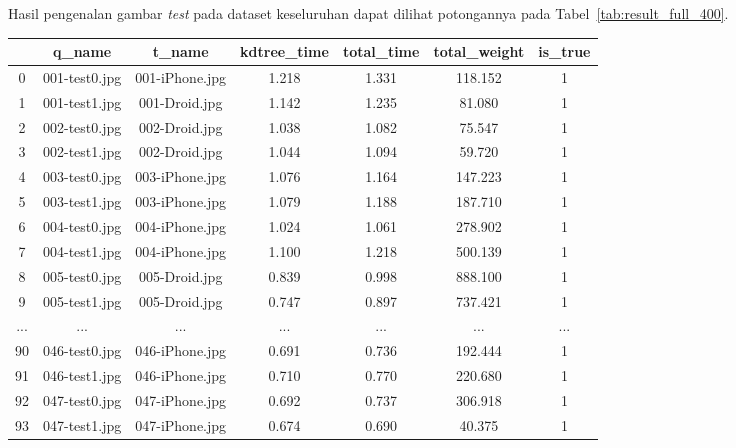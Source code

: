 Hasil pengenalan gambar \textit{test} pada dataset keseluruhan dapat dilihat potongannya pada Tabel~\ref{tab:result_full_400}.
\begin{table}[H]
	\centering
	\begin{tabular}{|c|c|c|c|c|c|c|} 
		\hline
		& \textbf{q\_name}       & \textbf{t\_name}        & \textbf{kdtree\_time} & \textbf{total\_time} & \textbf{total\_weight} & \textbf{is\_true}  \\ 
		\hline
		0   & 001-test0.jpg & 001-iPhone.jpg & 1.218        & 1.331       & 118.152       & 1         \\ 
		\hline
		1   & 001-test1.jpg & 001-Droid.jpg  & 1.142        & 1.235       & 81.080        & 1         \\ 
		\hline
		2   & 002-test0.jpg & 002-Droid.jpg  & 1.038        & 1.082       & 75.547        & 1         \\ 
		\hline
		3   & 002-test1.jpg & 002-Droid.jpg  & 1.044        & 1.094       & 59.720        & 1         \\ 
		\hline
		4   & 003-test0.jpg & 003-iPhone.jpg & 1.076        & 1.164       & 147.223       & 1         \\ 
		\hline
		5   & 003-test1.jpg & 003-iPhone.jpg & 1.079        & 1.188       & 187.710       & 1         \\ 
		\hline
		6   & 004-test0.jpg & 004-iPhone.jpg & 1.024        & 1.061       & 278.902       & 1         \\ 
		\hline
		7   & 004-test1.jpg & 004-iPhone.jpg & 1.100        & 1.218       & 500.139       & 1         \\ 
		\hline
		8   & 005-test0.jpg & 005-Droid.jpg  & 0.839        & 0.998       & 888.100       & 1         \\ 
		\hline
		9   & 005-test1.jpg & 005-Droid.jpg  & 0.747        & 0.897       & 737.421       & 1         \\ 
		\hline
		... & ...           & ...            & ...          & ...         & ...           & ...       \\ 
		\hline
		90  & 046-test0.jpg & 046-iPhone.jpg & 0.691        & 0.736       & 192.444       & 1         \\ 
		\hline
		91  & 046-test1.jpg & 046-iPhone.jpg & 0.710        & 0.770       & 220.680       & 1         \\ 
		\hline
		92  & 047-test0.jpg & 047-iPhone.jpg & 0.692        & 0.737       & 306.918       & 1         \\ 
		\hline
		93  & 047-test1.jpg & 047-iPhone.jpg & 0.674        & 0.690       & 40.375        & 1         \\ 

\end{tabular}
\end{table}
